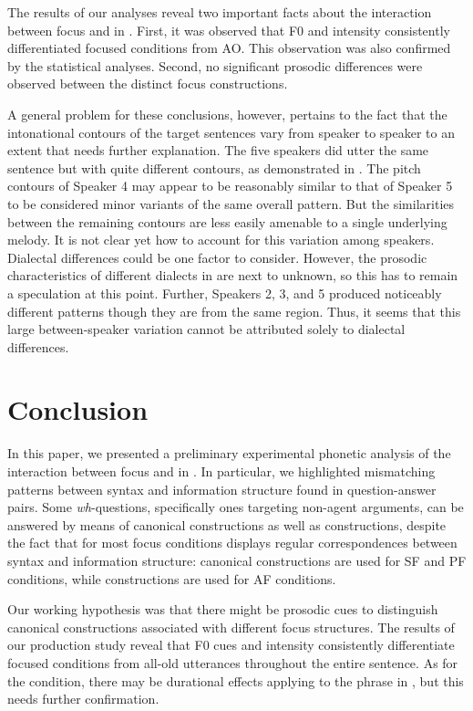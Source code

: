 \documentclass[output=paper]{langsci/langscibook}
\begin{document}
The results of our analyses reveal two important facts about the interaction between focus and  in . First, it was observed that F0 and intensity consistently differentiated focused conditions from AO. This observation was also confirmed by the statistical analyses. Second, no significant prosodic differences were observed between the distinct focus constructions.  

\largerpage
A general problem for these conclusions, however, pertains to the fact that the intonational contours of the target sentences vary from speaker to speaker to an extent that needs further explanation. The five speakers did utter the same sentence but with quite different contours, as demonstrated in . The pitch contours of Speaker 4 may appear to be reasonably similar to that of Speaker 5 to be considered minor variants of the same overall pattern. But the similarities between the remaining contours are less easily amenable to a single underlying melody. It is not clear yet how to account for this variation among  speakers. Dialectal differences could be one factor to consider.  However, the prosodic characteristics of different dialects in  are next to unknown, so this has to remain a speculation at this point. Further, Speakers 2, 3, and 5 produced noticeably different patterns though they are from the same region. Thus, it seems that this large between-speaker variation cannot be attributed solely to dialectal differences.

\section{\label{s:nagaya:4}Conclusion}

In this paper, we presented a preliminary experimental phonetic analysis of the interaction between focus and  in . In particular, we highlighted mismatching patterns between syntax and information structure found in question-answer pairs. Some \textit{wh}-questions, specifically ones targeting non-agent arguments, can be answered by means of canonical constructions as well as  constructions, despite the fact that for most focus conditions  displays regular correspondences between syntax and information structure: canonical constructions are used for SF and PF conditions, while  constructions are used for AF conditions.

Our working hypothesis was that there might be prosodic cues to distinguish canonical constructions associated with different focus structures. The results of our production study reveal that F0 cues and intensity consistently differentiate focused conditions from all-old utterances throughout the entire sentence. As for the  condition, there may be durational effects applying to the phrase in , but this needs further confirmation.
\end{document}
